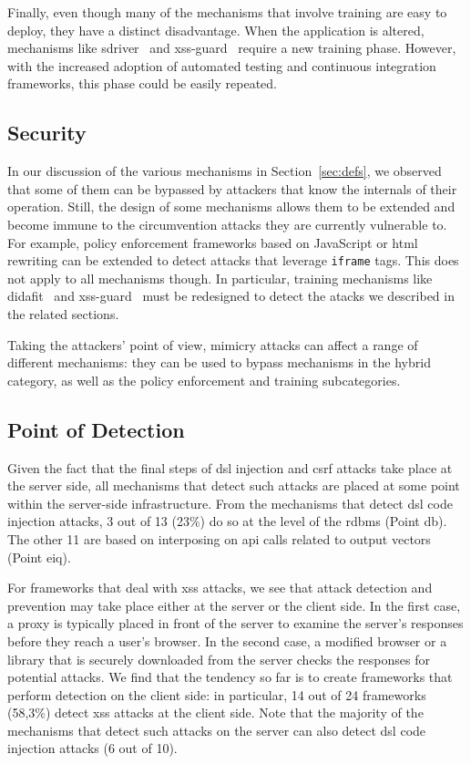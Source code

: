 \documentclass[conference]{IEEEtran}
\begin{document}
Finally, even though many of the mechanisms that involve
training are easy to deploy, they have a distinct disadvantage.
When the application is altered, mechanisms like
{\sc sd}river~\cite{MS09}
and {\sc xss-guard}~\cite{BV08} require a new training phase.
However, with the increased adoption of automated testing
and continuous integration frameworks, this phase could be
easily repeated.

\subsection{Security}

In our discussion of the various mechanisms in Section~\ref{sec:defs}, we
observed that some of them can be bypassed by attackers that know
the internals of their operation.
Still, the design of some mechanisms allows them to
be extended and become immune to the circumvention attacks they are
currently vulnerable to. For example, policy enforcement frameworks
based on JavaScript or {\sc html} rewriting can be extended
to detect attacks that leverage {\tt iframe} tags. This does not apply
to all mechanisms though. In particular, training mechanisms like {\sc
  didafit}~\cite{LLW02} and {\sc xss-guard}~\cite{BV08} must be
redesigned to detect the atacks we described in the related sections.

Taking the attackers' point of view, mimicry attacks can affect a
range of different mechanisms: they can be used to bypass mechanisms
in the hybrid category, as well as the policy enforcement and training
subcategories.

\subsection{Point of Detection}

Given the fact that the final steps of
{\sc dsl} injection and {\sc csrf} attacks take place
at the server side, all mechanisms that detect
such attacks are placed at some point within the server-side infrastructure.
From the mechanisms that detect {\sc dsl} code injection
attacks, 3 out of 13 (23\%) do so at the level
of the {\sc rdbms} (Point {\sc db}).
The other 11 are based on interposing on {\sc api} calls related to output
vectors (Point {\sc e}i{\sc q}).

For frameworks that deal with {\sc xss} attacks, we
see that attack detection and prevention may take place either at the server or
the client side. In the first case, a proxy is typically placed in front of the server
to examine the server's responses before they reach a user's 
browser. In the second case, a modified browser or a library that is
securely downloaded from the server checks the responses for potential
attacks. We find that the tendency so far is to create frameworks that
perform detection on the client side: in particular, 14 out of 24
frameworks (58,3\%) detect {\sc xss} attacks at the
client side. Note that the majority of the mechanisms that detect
such attacks on the server can also detect {\sc dsl} code
injection attacks (6 out of 10).
\end{document}
